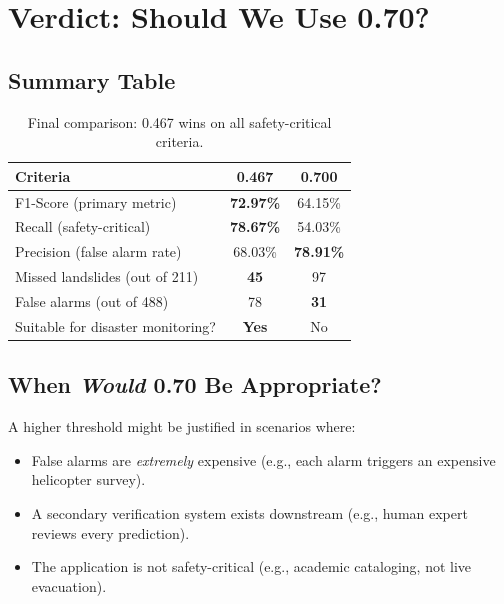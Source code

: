 \documentclass[11pt]{article}
\begin{document}
\section{Verdict: Should We Use 0.70?}

\begin{center}
\end{center}

\subsection{Summary Table}

\begin{table}[H]
\centering
\renewcommand{\arraystretch}{1.3}
\begin{tabular}{lcc}
\toprule
\textbf{Criteria} & \textbf{0.467} & \textbf{0.700} \\
\midrule
F1-Score (primary metric)     & \textbf{72.97\%} & 64.15\% \\
Recall (safety-critical)      & \textbf{78.67\%} & 54.03\% \\
Precision (false alarm rate)  & 68.03\% & \textbf{78.91\%} \\
Missed landslides (out of 211) & \textbf{45} & 97 \\
False alarms (out of 488)     & 78 & \textbf{31} \\
Suitable for disaster monitoring? & \textbf{Yes} & No \\
\bottomrule
\end{tabular}
\caption{Final comparison: 0.467 wins on all safety-critical criteria.}
\end{table}

\subsection{When \textit{Would} 0.70 Be Appropriate?}

A higher threshold might be justified in scenarios where:
\begin{itemize}[noitemsep]
    \item False alarms are \textit{extremely} expensive (e.g., each alarm triggers an expensive helicopter survey).
    \item A secondary verification system exists downstream (e.g., human expert reviews every prediction).
    \item The application is not safety-critical (e.g., academic cataloging, not live evacuation).
\end{itemize}
\end{document}
